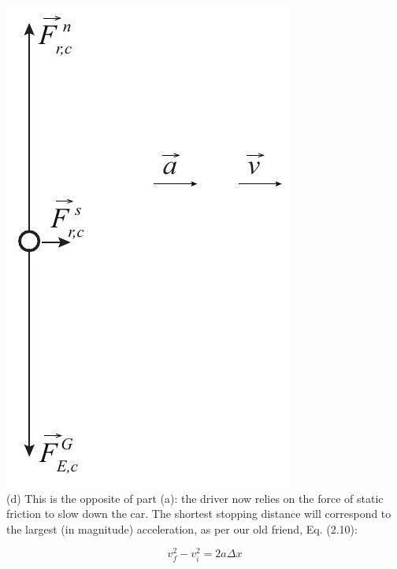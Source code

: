 \documentclass[10pt]{article}
\begin{document}
\includegraphics[max width=\textwidth, center]{2024_09_14_9969b06773f10b6936e8g-149}\\
(d) This is the opposite of part (a): the driver now relies on the force of static friction to slow down the car. The shortest stopping distance will correspond to the largest (in magnitude) acceleration, as per our old friend, Eq. (2.10):


\begin{equation*}
v_{f}^{2}-v_{i}^{2}=2 a \Delta x \tag{6.38}
\end{equation*}
\end{document}
